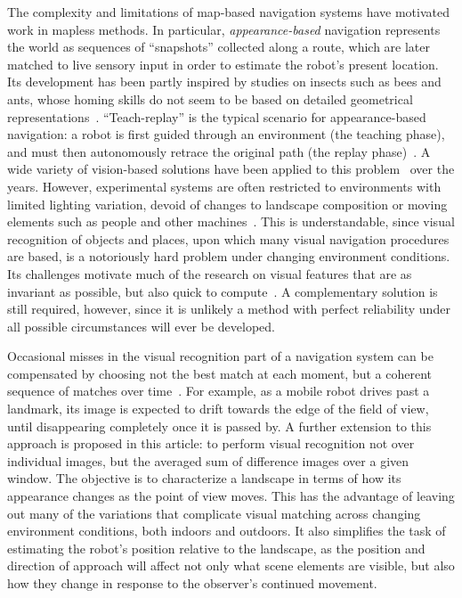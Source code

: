 \documentclass[twocolumn, 9pt,fleqn]{jsproceedings}
\begin{document}
The complexity and limitations of map-based navigation systems have motivated work in mapless methods. In particular, \textit{appearance-based} navigation represents the world as sequences of ``snapshots'' collected along a route, which are later matched to live sensory input in order to estimate the robot's present location. Its development has been partly inspired by studies on insects such as bees and ants, whose homing skills do not seem to be based on detailed geometrical representations~\cite{VAR05}. ``Teach-replay'' is the typical scenario for appearance-based navigation: a robot is first guided through an environment (the teaching phase), and must then autonomously retrace the original path (the replay phase)~\cite{BUR01}. A wide variety of vision-based solutions have been applied to this problem~\cite{VAR05,BUR01,OYA96,MAT96,LAM00,CHE06} over the years. However, experimental systems are often restricted to environments with limited lighting variation, devoid of changes to landscape composition or moving elements such as people and other machines~\cite{KIM08}. This is understandable, since visual recognition of objects and places, upon which many visual navigation procedures are based, is a notoriously hard problem under changing environment conditions. Its challenges motivate much of the research on visual features that are as invariant as possible, but also quick to compute~\cite{ORT12}. A complementary solution is still required, however, since it is unlikely a method with perfect reliability under all possible circumstances will ever be developed.

Occasional misses in the visual recognition part of a navigation system can be compensated by choosing not the best match at each moment, but a coherent sequence of matches over time~\cite{MIL12}. For example, as a mobile robot drives past a landmark, its image is expected to drift towards the edge of the field of view, until disappearing completely once it is passed by. A further extension to this approach is proposed in this article: to perform visual recognition not over individual images, but the averaged sum of difference images over a given window. The objective is to characterize a landscape in terms of how its appearance changes as the point of view moves. This has the advantage of leaving out many of the variations that complicate visual matching across changing environment conditions, both indoors and outdoors. It also simplifies the task of estimating the robot's position relative to the landscape, as the position and direction of approach will affect not only what scene elements are visible, but also how they change in response to the observer's continued movement.
\end{document}
